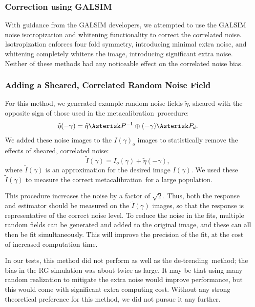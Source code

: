 \documentclass[usegraphicx,usenatbib]{mn2e}
\newcommand{\mcal}{metacalibration}
\newcommand{\detrend}{de-trending}
\begin{document}
\subsubsection{Correction using GALSIM}

With guidance from the GALSIM developers, we attempted to use the GALSIM noise
isotropization and whitening functionality to correct the correlated noise.
Isotropization enforces four fold symmetry, introducing minimal extra noise,
and whitening completely whitens the image, introducing significant extra
noise. Neither of these methods had any noticeable effect on the correlated
noise bias.

\subsubsection{Adding a Sheared, Correlated Random Noise Field}

For this method, we generated example random noise fields $\tilde{\eta}$, sheared
with the opposite sign of those used in the \mcal\ procedure:
\begin{equation}
    \tilde{\eta}(-\gamma) = \tilde{\eta} \Asterisk P^{-1} \oplus (-\gamma) \Asterisk P_{d}.
\end{equation}
We added these noise images to the $I(\gamma)_o$ images to
statistically remove the effects of sheared, correlated noise:
\begin{equation}
    \tilde{I}(\gamma) = I_o(\gamma) + \tilde{\eta}(-\gamma),
\end{equation}
where $\tilde{I}(\gamma)$ is an approximation for the desired image
$I(\gamma)$.    We used these $\tilde{I}(\gamma)$
to measure the correct \mcal\ for a large population.

This procedure increases the noise by a factor of $\sqrt 2$.  Thus, both the
response and estimator should be measured on the $\tilde{I}(\gamma)$ images, so
that the response is representative of the correct noise level.  To reduce the
noise in the fits, multiple random fields can be generated and added to the
original image, and these can all then be fit simultaneously.  This will
improve the precision of the fit, at the cost of increased computation time.

In our tests, this method did not perform as well as the \detrend\ method; the
bias in the RG simulation was about twice as large. It may be that using many
random realization to mitigate the extra noise would improve performance, but
this would come with significant extra computing cost.  Without any strong
theoretical preference for this method, we did not pursue it any further.
\end{document}
